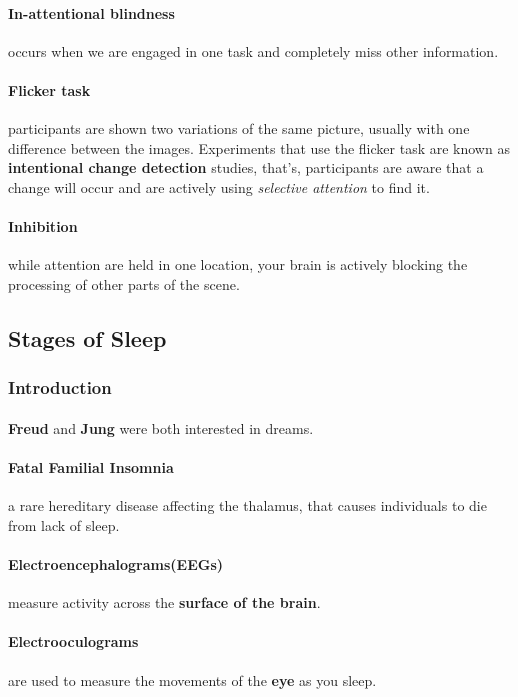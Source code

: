 \documentclass{article}
\begin{document}
	\paragraph{In-attentional blindness} occurs when we are engaged in one task and completely miss other information.
	\paragraph{Flicker task} participants are shown two variations of the same picture, usually with one difference between the images. Experiments that use the flicker task are known as \textbf{intentional change detection} studies, that's, participants are aware that a change will occur and are actively using \emph{selective attention} to find it.
	\paragraph{Inhibition} while attention are held in one location, your brain is actively blocking the processing of other parts of the scene.
	\subsection{Stages of Sleep}
	\subsubsection{Introduction}
	\paragraph{}\textbf{Freud} and \textbf{Jung} were both interested in dreams.
	\paragraph{Fatal Familial Insomnia} a rare hereditary disease affecting the thalamus, that causes individuals to die from lack of sleep.
	\paragraph{Electroencephalograms(EEGs)} measure activity across the \textbf{surface of the brain}.
	\paragraph{Electrooculograms} are used to measure the movements of the \textbf{eye} as you sleep.
\end{document}
